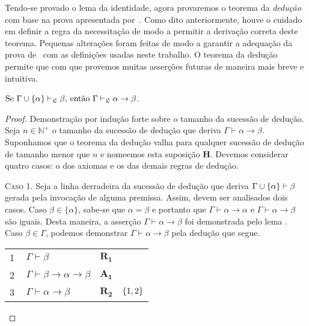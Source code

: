     \vspace{.5\baselineskip}
    Tendo-se provado o lema da identidade, agora provaremos o teorema da \emph{dedução} com base na prova apresentada por~\cite{Hakli}.
    Como dito anteriormente, houve o cuidado em definir a regra da necessitação de modo a permitir a derivação correta deste teorema.
    Pequenas alterações foram feitas de modo a garantir a adequação da prova de~\cite{Hakli} com as definições usadas neste trabalho.
    O teorema da dedução permite que com que provemos muitas asserções futuras de maneira mais breve e intuitiva.
    \vspace{.5\baselineskip}
    \begin{tcolorbox}[enhanced jigsaw, breakable, sharp corners, colframe=black, colback=white, boxrule=0.5pt, left=1.5mm, right=1.5mm, top=1.5mm, bottom=1.5mm]
        \begin{theorem}[Dedução]\label{deduction}
            $\text{Se }\Gamma\cup\left\{\alpha\right\}\vdash_{\mathfrak{L}}\beta\text{, então }\Gamma\vdash_{\mathfrak{L}}\alpha\to\beta$.
        \begin{proof}
        Demonstração por indução forte sobre o tamanho da sucessão de dedução.
        Seja $n\in\mathbb{N}^+$ o tamanho da sucessão de dedução que deriva $\Gamma\vdash\alpha\to\beta$.
        Suponhamos que o teorema da dedução valha para qualquer sucessão de dedução de tamanho menor que $n$ e nomeemos esta suposição $\mathbf{H}$.
        Devemos considerar quatro casos: o dos axiomas e os das demais regras de dedução.
        
        \begin{case}
        \vspace{\baselineskip}
        \textsc{Caso 1.}
        Seja a linha derradeira da sucessão de dedução que deriva $\Gamma\cup\left\{\alpha\right\}\vdash\beta$ gerada pela invocação de alguma premissa.
        Assim, devem ser analisados dois casos.
        Caso $\beta\in\{\alpha\}$, sabe-se que $\alpha=\beta$ e portanto que $\Gamma\vdash\alpha\to\alpha$ e $\Gamma\vdash\alpha\to\beta$ são iguais.
        Desta maneira, a asserção $\Gamma\vdash\alpha\to\beta$ foi demonstrada pelo lema .
        Caso $\beta\in\Gamma$, podemos demonstrar $\Gamma\vdash\alpha\to\beta$ pela dedução que segue.

        \vspace{0.5\baselineskip}
        \footnotesize
        \setlength{\rowskip}{0.5\baselineskip}
        \begin{xltabular}{\textwidth}{r | X l l}
            \scriptsize{\phantom{0}1}\phantom{ } & $\ \Gamma\vdash\beta$                  & \hyperref[modal.rule.1]{$\mathbf{R_1}$}\phantom{1} & \\[\rowskip]
            \scriptsize{\phantom{0}2}\phantom{ } & $\ \Gamma\vdash\beta\to\alpha\to\beta$ & \hyperref[modal.axiom.1]{$\mathbf{A_1}$}           & \\[\rowskip]
            \scriptsize{\phantom{0}3}\phantom{ } & $\ \Gamma\vdash\alpha\to\beta$         & $\hyperref[modal.rule.2]{\mathbf{R_2}}$            & $\left\{1,2\right\}$
        \end{xltabular}
        \normalsize
        \end{case}


\end{proof}
\end{theorem}
\end{tcolorbox}
